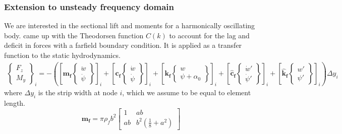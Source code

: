 \documentclass[10pt]{article}
\newcommand{\mbf}[1]{\mathbf{#1}}
\begin{document}
\subsubsection{Extension to unsteady frequency domain}
% 
We are interested in the sectional lift and moments for a harmonically oscillating body.
\citet{Theodorsen:1934} came up with the Theodorsen function $C(k)$ to account for the lag and deficit in forces with a farfield boundary condition.
It is applied as a transfer function to the static hydrodynamics.
\begin{eqnarray}
    \label{eqn:GenFluidTheod}
    \left\{\begin{matrix}
        F_z \\
        M_y
    \end{matrix}\right\}_i =
    -
    \left(
    \left[
        \mbf{m_f}
        \left\{
        \begin{matrix}
            \ddot{w} \\
            \ddot{\psi}
        \end{matrix}
        \right\}
        \right]_i
    +
    \left[
        \mbf{c_f}
        \left\{\begin{matrix}\dot{w} \\ \dot{\psi} \end{matrix}\right\}
        \right]_i
    +
    \left[
        \mbf{k_f}
        \left\{\begin{matrix}w \\ \psi + \alpha_0 \end{matrix}\right\}
        \right]_i
    +
    \left[
        \mbf{\hat{c}_f}
        \left\{\begin{matrix}\dot{w}' \\ \dot{\psi}' \end{matrix}\right\}
        \right]_i
    +
    \left[
        \mbf{\hat{k}_f}
        \left\{\begin{matrix}w' \\ \psi' \end{matrix}\right\}
        \right]_i
    \right)
    \Delta y_i
\end{eqnarray}
where $\Delta y_i$ is the strip width at node $i$, which we assume to be equal to element length.
% 
\begin{equation}
    \label{eqn:FluidMass}
    \mbf{m_f} = \pi \rho_f b^2 \begin{bmatrix}
        1  & ab                                \\
        ab & b^2\left(\frac{1}{8} + a^2\right)
    \end{bmatrix}
\end{equation}
\end{document}
